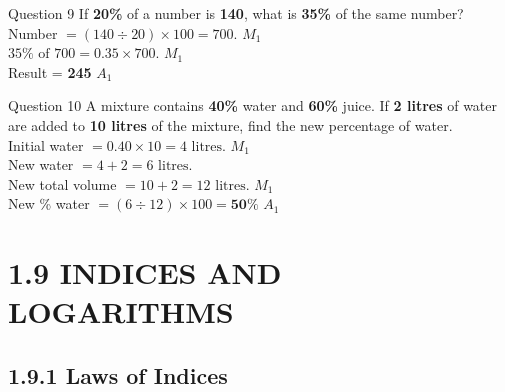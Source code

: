 \documentclass[12pt, a4paper, oneside]{article}
\begin{document}
\begin{solvingbox}{Question 9}
If \textbf{20\%} of a number is \textbf{140}, what is \textbf{35\%} of the same number? \\
Number $= (140 \div 20) \times 100 = 700$. \hfill $M_1$ \\
$35\% \text{ of } 700 = 0.35 \times 700$. \hfill $M_1$ \\
Result = \textbf{245} \hfill $A_1$
\end{solvingbox}

\begin{solvingbox}{Question 10}
A mixture contains \textbf{40\%} water and \textbf{60\%} juice. If \textbf{2 litres} of water are added to \textbf{10 litres} of the mixture, find the new percentage of water. \\
Initial water $= 0.40 \times 10 = 4\text{ litres}$. \hfill $M_1$ \\
New water $= 4 + 2 = 6\text{ litres}$. \\
New total volume $= 10 + 2 = 12\text{ litres}$. \hfill $M_1$ \\
New \% water $= (6 \div 12) \times 100 = \mathbf{50\%}$ \hfill $A_1$
\end{solvingbox}
\section*{1.9 INDICES AND LOGARITHMS}

\subsection*{1.9.1 Laws of Indices}
\end{document}

